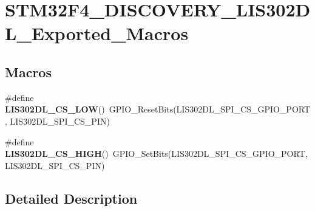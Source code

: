 \hypertarget{group___s_t_m32_f4___d_i_s_c_o_v_e_r_y___l_i_s302_d_l___exported___macros}{\section{S\-T\-M32\-F4\-\_\-\-D\-I\-S\-C\-O\-V\-E\-R\-Y\-\_\-\-L\-I\-S302\-D\-L\-\_\-\-Exported\-\_\-\-Macros}
\label{group___s_t_m32_f4___d_i_s_c_o_v_e_r_y___l_i_s302_d_l___exported___macros}
}
\subsection*{Macros}
\begin{DoxyCompactItemize}
\item 
\hypertarget{group___s_t_m32_f4___d_i_s_c_o_v_e_r_y___l_i_s302_d_l___exported___macros_gab498f81ee877cf0394df68b1075f614d}{\#define {\bfseries L\-I\-S302\-D\-L\-\_\-\-C\-S\-\_\-\-L\-O\-W}()~G\-P\-I\-O\-\_\-\-Reset\-Bits(L\-I\-S302\-D\-L\-\_\-\-S\-P\-I\-\_\-\-C\-S\-\_\-\-G\-P\-I\-O\-\_\-\-P\-O\-R\-T, L\-I\-S302\-D\-L\-\_\-\-S\-P\-I\-\_\-\-C\-S\-\_\-\-P\-I\-N)}\label{group___s_t_m32_f4___d_i_s_c_o_v_e_r_y___l_i_s302_d_l___exported___macros_gab498f81ee877cf0394df68b1075f614d}

\item 
\hypertarget{group___s_t_m32_f4___d_i_s_c_o_v_e_r_y___l_i_s302_d_l___exported___macros_ga3665b659bf9306f3c78931722ae17d1b}{\#define {\bfseries L\-I\-S302\-D\-L\-\_\-\-C\-S\-\_\-\-H\-I\-G\-H}()~G\-P\-I\-O\-\_\-\-Set\-Bits(L\-I\-S302\-D\-L\-\_\-\-S\-P\-I\-\_\-\-C\-S\-\_\-\-G\-P\-I\-O\-\_\-\-P\-O\-R\-T, L\-I\-S302\-D\-L\-\_\-\-S\-P\-I\-\_\-\-C\-S\-\_\-\-P\-I\-N)}\label{group___s_t_m32_f4___d_i_s_c_o_v_e_r_y___l_i_s302_d_l___exported___macros_ga3665b659bf9306f3c78931722ae17d1b}

\end{DoxyCompactItemize}


\subsection{Detailed Description}

